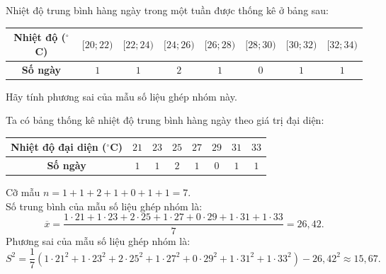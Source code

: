 \begin{bt}[Mức độ 2]%
Nhiệt độ trung bình hàng ngày trong một tuần được thống kê ở bảng sau:
\begin{center}
\begin{tabular}{|c|c|c|c|c|c|c|c|}
\hline
\textbf{Nhiệt độ ($^\circ$C)} & $[20; 22)$ & $[22; 24)$ & $[24; 26)$ & $[26; 28)$ & $[28; 30)$ & $[30; 32)$ & $[32; 34)$ \\
\hline
\textbf{Số ngày} & $1$ & $1$ & $2$ & $1$ & $0$ & $1$ & $1$ \\
\hline
\end{tabular}
\end{center}
Hãy tính phương sai của mẫu số liệu ghép nhóm này.
\loigiai
{
Ta có bảng thống kê nhiệt độ trung bình hàng ngày theo giá trị đại diện:
\begin{center}
\begin{tabular}{|c|c|c|c|c|c|c|c|}
\hline
\textbf{Nhiệt độ đại diện ($^\circ$C)} & $21$ & $23$ & $25$ & $27$ & $29$ & $31$ & $33$ \\
\hline
\textbf{Số ngày} & $1$ & $1$ & $2$ & $1$ & $0$ & $1$ & $1$ \\
\hline
\end{tabular}
\end{center}
Cỡ mẫu $n=1+1+2+1+0+1+1=7$.\\
Số trung bình của mẫu số liệu ghép nhóm là:
\[ \overline{x}=\dfrac{1\cdot 21+1\cdot 23+2\cdot 25+1\cdot 27+0\cdot 29+1\cdot 31+1\cdot 33}{7}=26{,}42. \]
Phương sai của mẫu số liệu ghép nhóm là:
\[ S^2=\dfrac{1}{7}\left(1\cdot 21^2+1\cdot 23^2+2\cdot 25^2+1\cdot 27^2+0\cdot 29^2+1\cdot 31^2+1\cdot 33^2 \right)-26{,}42^2\approx 15{,}67. \]
}
\end{bt}


